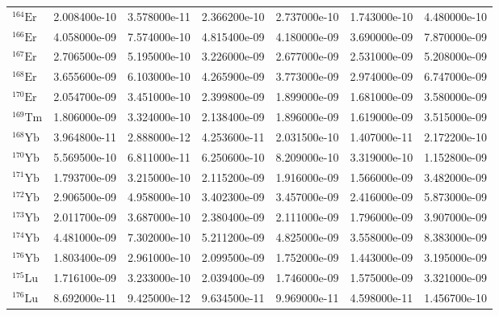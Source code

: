\begin{tabular}{lrrrrrr}
$^{164}\mathrm{Er}$ &       2.008400e-10 &      3.578000e-11 &      2.366200e-10 &       2.737000e-10 &      1.743000e-10 &      4.480000e-10 \\
$^{166}\mathrm{Er}$ &       4.058000e-09 &      7.574000e-10 &      4.815400e-09 &       4.180000e-09 &      3.690000e-09 &      7.870000e-09 \\
$^{167}\mathrm{Er}$ &       2.706500e-09 &      5.195000e-10 &      3.226000e-09 &       2.677000e-09 &      2.531000e-09 &      5.208000e-09 \\
$^{168}\mathrm{Er}$ &       3.655600e-09 &      6.103000e-10 &      4.265900e-09 &       3.773000e-09 &      2.974000e-09 &      6.747000e-09 \\
$^{170}\mathrm{Er}$ &       2.054700e-09 &      3.451000e-10 &      2.399800e-09 &       1.899000e-09 &      1.681000e-09 &      3.580000e-09 \\
$^{169}\mathrm{Tm}$ &       1.806000e-09 &      3.324000e-10 &      2.138400e-09 &       1.896000e-09 &      1.619000e-09 &      3.515000e-09 \\
$^{168}\mathrm{Yb}$ &       3.964800e-11 &      2.888000e-12 &      4.253600e-11 &       2.031500e-10 &      1.407000e-11 &      2.172200e-10 \\
$^{170}\mathrm{Yb}$ &       5.569500e-10 &      6.811000e-11 &      6.250600e-10 &       8.209000e-10 &      3.319000e-10 &      1.152800e-09 \\
$^{171}\mathrm{Yb}$ &       1.793700e-09 &      3.215000e-10 &      2.115200e-09 &       1.916000e-09 &      1.566000e-09 &      3.482000e-09 \\
$^{172}\mathrm{Yb}$ &       2.906500e-09 &      4.958000e-10 &      3.402300e-09 &       3.457000e-09 &      2.416000e-09 &      5.873000e-09 \\
$^{173}\mathrm{Yb}$ &       2.011700e-09 &      3.687000e-10 &      2.380400e-09 &       2.111000e-09 &      1.796000e-09 &      3.907000e-09 \\
$^{174}\mathrm{Yb}$ &       4.481000e-09 &      7.302000e-10 &      5.211200e-09 &       4.825000e-09 &      3.558000e-09 &      8.383000e-09 \\
$^{176}\mathrm{Yb}$ &       1.803400e-09 &      2.961000e-10 &      2.099500e-09 &       1.752000e-09 &      1.443000e-09 &      3.195000e-09 \\
$^{175}\mathrm{Lu}$ &       1.716100e-09 &      3.233000e-10 &      2.039400e-09 &       1.746000e-09 &      1.575000e-09 &      3.321000e-09 \\
$^{176}\mathrm{Lu}$ &       8.692000e-11 &      9.425000e-12 &      9.634500e-11 &       9.969000e-11 &      4.598000e-11 &      1.456700e-10 \\

\end{tabular}
